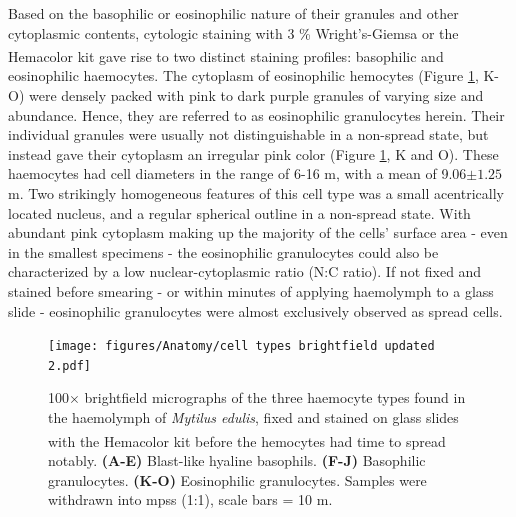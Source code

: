 Based on the basophilic or eosinophilic nature of their granules and other cytoplasmic contents, cytologic staining with 3 \% Wright's-Giemsa or the Hemacolor\textsuperscript{\textregistered} kit gave rise to two distinct staining profiles: basophilic and eosinophilic haemocytes. The cytoplasm of eosinophilic hemocytes (Figure \ref{fig:celltypes}, K-O) were densely packed with pink to dark purple granules of varying size and abundance. Hence, they are referred to as eosinophilic granulocytes herein. Their individual granules were usually not distinguishable in a non-spread state, but instead gave their cytoplasm an irregular pink color (Figure \ref{fig:celltypes}, K and O). These haemocytes had cell diameters in the range of 6-16 \micro m, with a mean of 9.06$\pm1.25$ \micro m. Two strikingly homogeneous features of this cell type was a small acentrically located nucleus, and a regular spherical outline in a non-spread state. With abundant pink cytoplasm making up the majority of the cells' surface area - even in the smallest specimens - the eosinophilic granulocytes could also be characterized by a low nuclear-cytoplasmic ratio (N:C ratio). If not fixed and stained before smearing - or within minutes of applying haemolymph to a glass slide - eosinophilic granulocytes were almost exclusively observed as spread cells. 

\begin{figure}[H]
    \centering
    \texttt{[image: figures/Anatomy/cell types brightfield updated 2.pdf]}
    \caption{100$\times$ brightfield micrographs of the three haemocyte types found in the haemolymph of \emph{Mytilus edulis}, fixed and stained on glass slides with the Hemacolor\textsuperscript{\textregistered} kit before the hemocytes had time to spread notably. \textbf{(A-E)} Blast-like hyaline basophils. \textbf{(F-J)} Basophilic granulocytes. \textbf{(K-O)} Eosinophilic granulocytes. Samples were withdrawn into \acrshort{mpss} (1:1), scale bars = 10 \micro m.}
    \label{fig:celltypes}
\end{figure}

